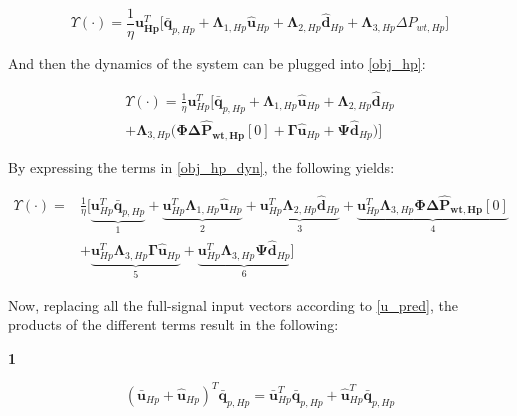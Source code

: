 \begin{equation}
  \Upsilon(\cdot) = \frac{1}{\eta} {\bm{{u}}}_{\bm{{Hp}}}^{T}\bigg[ {\bm{\bar{q}}}_{p,Hp} + {\bm{\Lambda}}_{1,Hp} {\bm{\hat{u}}}_{Hp} + {\bm{\Lambda}}_{2,Hp} {\bm{\hat{d}}}_{Hp} 
  + {\bm{\Lambda}}_{3,Hp} \Delta P_{wt,Hp} \bigg]
 \label{obj_hp}
\end{equation}

And then the dynamics of the system can be plugged into \eqref{obj_hp}:

\begin{equation}
\begin{aligned}
 \Upsilon(\cdot) = \frac{1}{\eta} {\bm{{u}}}_{Hp}^{T}\bigg[ {\bm{\bar{q}}}_{p,Hp} + {\bm{\Lambda}}_{1,Hp} {\bm{\hat{u}}}_{Hp} + {\bm{\Lambda}}_{2,Hp} {\bm{\hat{d}}}_{Hp} 
   \\ + {\bm{\Lambda}}_{3,Hp} \bigg( \bm{\Phi} \bm{\Delta \hat{P}_{wt,Hp}}[0] + \bm{\Gamma} \bm{\hat{u}}_{Hp} + \bm{\Psi}\bm{\hat{d}}_{Hp} \bigg) \bigg]
\end{aligned}
\label{obj_hp_dyn}
\end{equation}

By expressing the terms in \eqref{obj_hp_dyn}, the following yields:

\begin{equation}
\begin{aligned} 
 \Upsilon(\cdot) = & \frac{1}{\eta} \bigg[ \underbrace{{\bm{{u}}}_{Hp}^{T}{\bm{\bar{q}}}_{p,Hp}}_{1} + \underbrace{{\bm{{u}}}_{Hp}^{T}{\bm{\Lambda}}_{1,Hp} {\bm{\hat{u}}}_{Hp}}_{2} + \underbrace{{\bm{{u}}}_{Hp}^{T}{\bm{\Lambda}}_{2,Hp} {\bm{\hat{d}}}_{Hp} 
 }_{3} + \underbrace{{\bm{{u}}}_{Hp}^{T}{\bm{\Lambda}}_{3,Hp}\bm{\Phi} \bm{\Delta \hat{P}_{wt,Hp}}[0]}_{4}
 \\
 & + \underbrace{{\bm{{u}}}_{Hp}^{T}{\bm{\Lambda}}_{3,Hp}\bm{\Gamma} \bm{\hat{u}}_{Hp}}_{5} + \underbrace{{\bm{{u}}}_{Hp}^{T}{\bm{\Lambda}}_{3,Hp}\bm{\Psi}\bm{\hat{d}}_{Hp}}_{6} \bigg]
 \end{aligned}
\end{equation}

Now, replacing all the full-signal input vectors according to \eqref{u_pred}, the products of the different terms result in the following: 

\textbf{1}

\begin{equation}
 ({\bm{\bar{u}}}_{Hp} + {\bm{\hat{u}}}_{Hp})^{T} \bm{\bar{q}}_{p,Hp}  = {\bm{\bar{u}}}_{Hp}^{T} \bm{\bar{q}}_{p,Hp} + {\bm{\hat{u}}}_{Hp}^{T} \bm{\bar{q}}_{p,Hp}
\end{equation}


